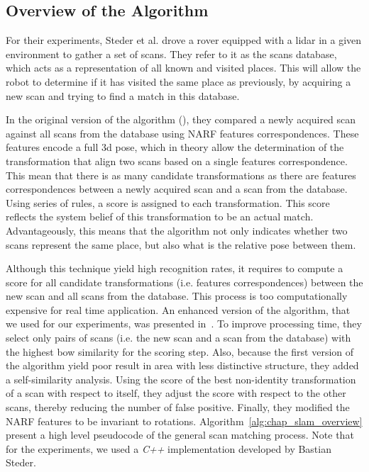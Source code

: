 \subsection{Overview of the Algorithm}
\label{ssec:chap_slam_algo}

For their experiments, Steder et al. drove a rover equipped with a \gls*{lidar} in a given environment to gather a set of scans. They refer to it as the scans database, which acts as a representation of all known and visited places. This will allow the robot to determine if it has visited the same place as previously, by acquiring a new scan and trying to find a match in this database.  

In the original version of the algorithm (\cite{Steder2010}), they compared a newly acquired scan against all scans from the database using NARF features correspondences. These features encode a full \gls*{3d} pose, which in theory allow the determination of the transformation that align two scans based on a single features correspondence. This mean that there is as many candidate transformations as there are features correspondences between a newly acquired scan and a scan from the database. Using series of rules, a score is assigned to each transformation. This score reflects the system belief of this transformation to be an actual match. Advantageously, this means that the algorithm not only indicates whether two scans represent the same place, but also what is the relative pose between them.

Although this technique yield high recognition rates, it requires to compute a score for all candidate transformations (i.e. features correspondences) between the new scan and all scans from the database. This process is too computationally expensive for real time application. An enhanced version of the algorithm, that we used for our experiments, was presented in~\cite{Steder2011b}. To improve processing time, they select only pairs of scans (i.e. the new scan and a scan from the database) with the highest \gls*{bow} similarity for the scoring step. Also, because the first version of the algorithm yield poor result in area with less distinctive structure, they added a self-similarity analysis. Using the score of the best non-identity transformation of a scan with respect to itself, they adjust the score with respect to the other scans, thereby reducing the number of false positive. Finally, they modified the NARF features to be invariant to rotations. Algorithm~\ref{alg:chap_slam_overview} present a high level pseudocode of the general scan matching process. Note that for the experiments, we used a \textit{C++} implementation developed by Bastian Steder.


